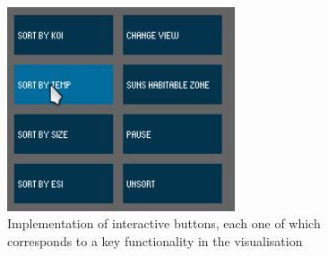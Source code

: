 \clearpage
\begin{figure}[H]
  \centering
      \includegraphics[width=0.6\textwidth]{images/buttons.jpg}
  \caption[Implementation of interactive buttons]{Implementation of interactive
buttons, each one of which corresponds to a key functionality in the
visualisation}
  \label{fig:buttons}
\end{figure}

